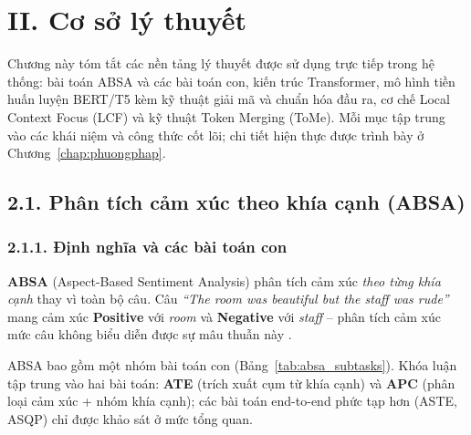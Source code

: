 \providecommand{\cmark}{\ensuremath{\checkmark}}
\providecommand{\xmark}{\ensuremath{\times}}

\chapter{II. Cơ sở lý thuyết}
\label{chap:coso_lythuyet}

Chương này tóm tắt các nền tảng lý thuyết được sử dụng trực tiếp trong
hệ thống: bài toán ABSA và các bài toán con, kiến trúc Transformer,
mô hình tiền huấn luyện BERT/T5 kèm kỹ thuật giải mã và chuẩn hóa đầu
ra, cơ chế Local Context Focus (LCF) và kỹ thuật Token Merging (ToMe).
Mỗi mục tập trung vào các khái niệm và công thức cốt lõi; chi tiết
hiện thực được trình bày ở Chương~\ref{chap:phuongphap}.

\section{2.1.\; Phân tích cảm xúc theo khía cạnh (ABSA)}
\label{sec:absa}

\subsection{2.1.1.\; Định nghĩa và các bài toán con}
\label{subsec:absa_subtasks}

\textbf{ABSA} (Aspect-Based Sentiment Analysis) phân tích cảm xúc
\emph{theo từng khía cạnh} thay vì toàn bộ câu. Câu
\textit{``The room was beautiful but the staff was rude''} mang cảm
xúc \textbf{Positive} với \textit{room} và \textbf{Negative} với
\textit{staff} -- phân tích cảm xúc mức câu không biểu diễn được sự
mâu thuẫn này \cite{pontiki2016semeval}.

ABSA bao gồm một nhóm bài toán con (Bảng~\ref{tab:absa_subtasks}).
Khóa luận tập trung vào hai bài toán: \textbf{ATE} (trích xuất cụm
từ khía cạnh) và \textbf{APC} (phân loại cảm xúc + nhóm khía cạnh);
các bài toán end-to-end phức tạp hơn (ASTE, ASQP) chỉ được khảo sát
ở mức tổng quan.

